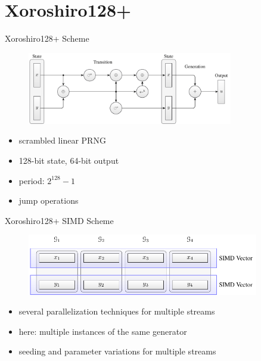 \documentclass[aspectratio=169]{beamer}
\begin{document}
  \section{Xoroshiro128+} %
  \label{sec:implementation}
    \begin{frame}{Xoroshiro128+ Scheme}
      \begin{figure}
        \includegraphics[width=0.8\textwidth]{figures/xrsr128p_scheme.pdf}
      \end{figure}
      \bigskip
      \begin{minipage}{0.5\textwidth}
        \begin{itemize}
          \pause
          \item scrambled linear PRNG
          \pause
          \item 128-bit state, 64-bit output
        \end{itemize}
      \end{minipage}
      \hfill
      \begin{minipage}{0.49\textwidth}
        \begin{itemize}
          \pause
          \item period: $2^{128}-1$
          \pause
          \item jump operations
        \end{itemize}
      \end{minipage}
    \end{frame}

    \begin{frame}{Xoroshiro128+ SIMD Scheme}
      \begin{figure}
        \includegraphics[width=0.9\textwidth]{figures/xrsr128p_vector_layout.pdf}
      \end{figure}
      \begin{itemize}
        \pause
        \item several parallelization techniques for multiple streams
        \pause
        \item here: multiple instances of the same generator
        \pause
        \item seeding and parameter variations for multiple streams
      \end{itemize}
    \end{frame}
\end{document}
